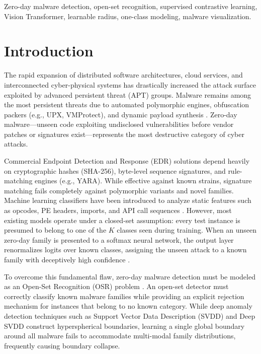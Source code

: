 \documentclass[conference]{IEEEtran}
\begin{document}
\begin{IEEEkeywords}
Zero-day malware detection, open-set recognition, supervised contrastive learning, Vision Transformer, learnable radius, one-class modeling, malware visualization.
\end{IEEEkeywords}

\section{Introduction}
The rapid expansion of distributed software architectures, cloud services, and interconnected cyber-physical systems has drastically increased the attack surface exploited by advanced persistent threat (APT) groups. Malware remains among the most persistent threats due to automated polymorphic engines, obfuscation packers (e.g., UPX, VMProtect), and dynamic payload synthesis \cite{bilge2012}. Zero-day malware—unseen code exploiting undisclosed vulnerabilities before vendor patches or signatures exist—represents the most destructive category of cyber attacks.

Commercial Endpoint Detection and Response (EDR) solutions depend heavily on cryptographic hashes (SHA-256), byte-level sequence signatures, and rule-matching engines (e.g., YARA). While effective against known strains, signature matching fails completely against polymorphic variants and novel families. Machine learning classifiers have been introduced to analyze static features such as opcodes, PE headers, imports, and API call sequences \cite{gandotra2014, rathore2018}. However, most existing models operate under a closed-set assumption: every test instance is presumed to belong to one of the $K$ classes seen during training. When an unseen zero-day family is presented to a softmax neural network, the output layer renormalizes logits over known classes, assigning the unseen attack to a known family with deceptively high confidence \cite{bendale2016}.

To overcome this fundamental flaw, zero-day malware detection must be modeled as an Open-Set Recognition (OSR) problem \cite{bendale2016}. An open-set detector must correctly classify known malware families while providing an explicit rejection mechanism for instances that belong to no known category. While deep anomaly detection techniques such as Support Vector Data Description (SVDD) \cite{tax2004} and Deep SVDD \cite{ruff2018} construct hyperspherical boundaries, learning a single global boundary around all malware fails to accommodate multi-modal family distributions, frequently causing boundary collapse.
\end{document}
